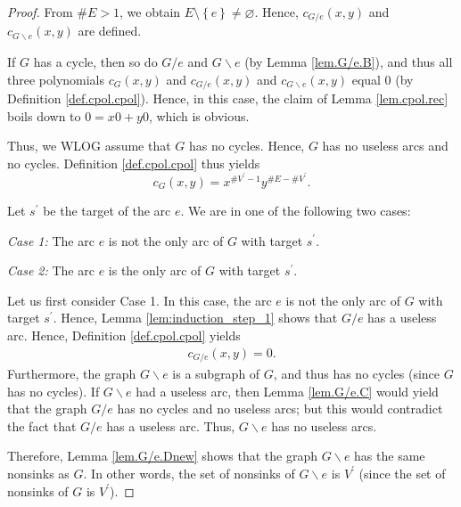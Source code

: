 \documentclass[12pt]{amsart}
\theoremstyle{definition}
\newcommand{\tup}[1]{\left( #1 \right)}
\newcommand{\NS}{V^{\prime}}
\begin{document}
\begin{proof}
From $\#E>1$, we obtain %
$E\setminus\left\{  e\right\}  \neq\varnothing$.
Hence, $c_{G/e}\tup{x,y}$ and $c_{G\backslash e}\tup{x,y}$ are defined.

If $G$ has a cycle, then so do $G/e$ and $G\backslash e$ (by Lemma
\ref{lem.G/e.B}), and thus all three polynomials $c_{G}\left(  x,y\right)  $
and $c_{G/e}\left(  x,y\right)  $ and $c_{G\backslash e}\left(  x,y\right)  $
equal $0$ (by Definition \ref{def.cpol.cpol}). Hence, in this case, the claim
of Lemma \ref{lem.cpol.rec} boils down to $0=x0+y0$, which is obvious.

Thus, we WLOG assume that $G$ has no cycles. Hence, $G$ has no useless arcs
and no cycles. Definition \ref{def.cpol.cpol} thus yields%
\begin{equation}
c_{G}\left(  x,y\right)  =x^{\#\NS -1}y^{\#E-\#\NS}.
\label{pf.lem.cpol.rec.cG=}
\end{equation}


Let $s^{\prime}$ be the target of the arc $e$. We are in one of the following
two cases:

\textit{Case 1:} The arc $e$ is not the only arc of $G$ with target
$s^{\prime}$.

\textit{Case 2:} The arc $e$ is the only arc of $G$ with target $s^{\prime}$.

Let us first consider Case 1. In this case, the arc $e$ is not the only arc
of $G$ with target $s^{\prime}$. Hence, Lemma \ref{lem:induction_step_1} shows
that $G/e$ has a useless arc. Hence, Definition \ref{def.cpol.cpol} yields
\begin{align}
c_{G/e}\left(  x,y\right)  =0.
\label{pf.lem.cpol.rec.c1.0}
\end{align}
Furthermore, the graph $G\backslash e$ is a subgraph of $G$, and thus has no
cycles (since $G$ has no cycles). If $G\backslash e$ had a useless arc, then
Lemma \ref{lem.G/e.C} would yield that the graph $G/e$ has no cycles and no
useless arcs; but this would contradict the fact that $G/e$ has a useless
arc. Thus, $G\backslash e$ has no useless arcs.

Therefore, Lemma \ref{lem.G/e.Dnew} shows that the graph $G\backslash e$
has the same nonsinks as $G$. In other words, the set of nonsinks of
$G\backslash e$ is $\NS$ (since the set of nonsinks of $G$ is
$\NS$).


\end{proof}
\end{document}
